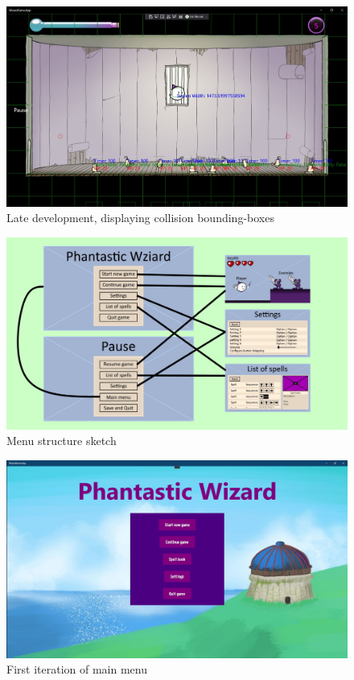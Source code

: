 \documentclass[12pt]{article}
\begin{document}
\begin{figure}[H]
    \centering
    \includegraphics[max width=\textwidth]{images/019.JPG}
    \caption{Late development, displaying collision bounding-boxes}
\end{figure}

\begin{figure}[H]
    \centering
    \includegraphics[max width=\textwidth]{images/menu_structure.jpg}
    \caption{Menu structure sketch}
\end{figure}

\begin{figure}[H]
    \centering
    \includegraphics[max width=\textwidth]{images/013.JPG}
    \caption{First iteration of main menu}
\end{figure}
\end{document}
